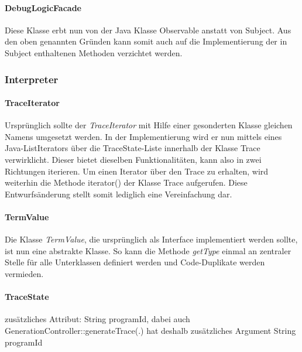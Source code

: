\documentclass[parskip=full]{scrartcl}
\begin{document}
\paragraph{DebugLogicFacade}
Diese Klasse erbt nun von der Java Klasse Observable anstatt von Subject.
Aus den oben genannten Gründen kann somit auch auf die Implementierung der in Subject enthaltenen Methoden verzichtet werden.

\subsubsection{Interpreter}
\paragraph{TraceIterator}
Ursprünglich sollte der \textit{TraceIterator} mit Hilfe einer gesonderten Klasse gleichen Namens umgesetzt werden. In der Implementierung wird er nun mittels eines Java-ListIterators über die TraceState-Liste innerhalb der Klasse Trace verwirklicht. Dieser bietet dieselben Funktionalitäten, kann also in zwei Richtungen iterieren. Um einen Iterator über den Trace zu erhalten, wird weiterhin die Methode iterator() der Klasse Trace aufgerufen. Diese Entwurfsänderung stellt somit lediglich eine Vereinfachung dar.
\paragraph{TermValue}
Die Klasse \textit{TermValue}, die ursprünglich als Interface implementiert werden sollte, ist nun eine abstrakte Klasse. So kann die Methode \textit{getType} einmal an zentraler Stelle für alle Unterklassen definiert werden und Code-Duplikate werden vermieden.
\paragraph{TraceState} zusätzliches Attribut: String programId, dabei auch GenerationController::generateTrace(.) hat deshalb zusätzliches Argument String programId
\end{document}
